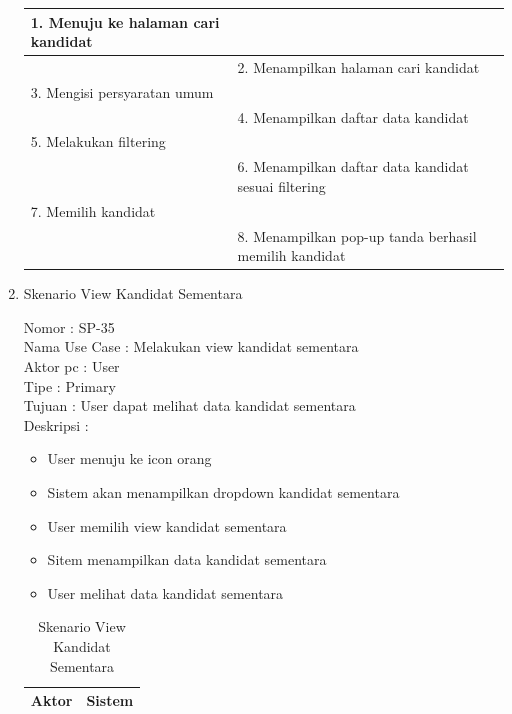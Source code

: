 \begin{enumerate}
\begin{table}
\begin{tabular}{ | l | p{67.5mm}|}
		1.	Menuju ke halaman cari kandidat &  \\
		
		\hline
		
		&  2.	Menampilkan halaman cari kandidat \\
		
		\hline
		
		3. Mengisi persyaratan umum & \\
		
		\hline
		
		& 4. Menampilkan daftar data kandidat \\
		\hline
		
		5. Melakukan filtering & \\
		\hline
		
		& 6. Menampilkan daftar data kandidat sesuai filtering \\
		\hline
		
		
		7. Memilih kandidat & \\
		\hline
		
		&8. Menampilkan pop-up tanda berhasil memilih kandidat \\
		\hline
		
	\end{tabular}
\end{table}

\item Skenario View Kandidat Sementara

Nomor \kern 3.6pc : SP-35 \\
Nama Use Case : Melakukan view kandidat sementara \\
Aktor  pc : User \\
Tipe \kern 4.6pc : Primary \\
Tujuan \kern 3.6pc : User dapat melihat data kandidat sementara \\
Deskripsi \kern 2.5pc : 

\begin{itemize}
	\item User menuju ke icon orang
	\item Sistem akan menampilkan dropdown kandidat sementara
	\item User memilih view kandidat sementara
	\item Sitem menampilkan data kandidat sementara
	\item User melihat data kandidat sementara

	
\end{itemize}

\begin{table}
	\caption{Skenario View Kandidat Sementara}
	\centering
	\begin{tabular}{ | l | p{66mm}|}
		\hline 
		\textbf{Aktor} & \textbf{Sistem} \\
		\hline
		

\end{tabular}
\end{table}
\end{enumerate}

